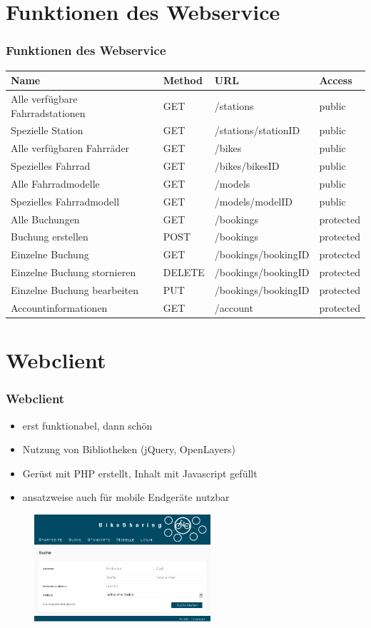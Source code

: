 \section{Funktionen des Webservice}
\begin{frame}
	\frametitle*{Funktionen des Webservice}
		\begin{tabularx}{\columnwidth}{|X|p{1cm}|p{2.5cm}|p{1.5cm}|}
		\hline
		Name & Method & URL & Access \\
		\hline
		\hline
		Alle verfügbare Fahrradstationen & GET & /stations & public \\
		\hline
		Spezielle Station & GET & /stations/stationID & public \\
		\hline
		Alle verfügbaren Fahrräder & GET & /bikes & public \\
		\hline
		Spezielles Fahrrad & GET & /bikes/bikesID & public \\
		\hline
		Alle Fahrradmodelle & GET & /models & public \\
		\hline
		Spezielles Fahrradmodell & GET & /models/modelID & public \\
		\hline
		Alle Buchungen & GET & /bookings & protected \\
		\hline
		Buchung erstellen & POST & /bookings & protected \\
		\hline
		Einzelne Buchung & GET & /bookings/bookingID & protected \\
		\hline
		Einzelne Buchung stornieren & DELETE & /bookings/bookingID & protected \\
		\hline
		Einzelne Buchung bearbeiten & PUT & /bookings/bookingID & protected \\
		\hline
		Accountinformationen & GET & /account & protected \\
		\hline
	\end{tabularx}
\end{frame}

\section{Webclient}
\begin{frame}
	\frametitle*{Webclient}
	\begin{itemize}
		\item erst funktionabel, dann schön
		\item Nutzung von Bibliotheken (jQuery, OpenLayers)
		\item Gerüst mit PHP erstellt, Inhalt mit Javascript gefüllt
		\item ansatzweise auch für mobile Endgeräte nutzbar
	\end{itemize}
	\begin{figure}
		\centering
		\includegraphics[height=40mm]{pics/bikesharing_search.png}
	\end{figure}
\end{frame}

